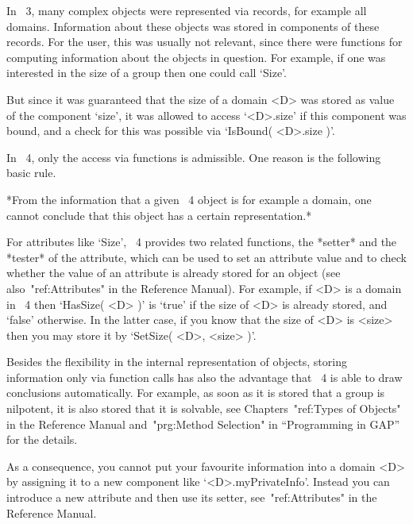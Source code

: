 
In {\GAP}~3, many complex objects were represented via records, for
example all domains.  Information about these objects was stored in
components of these records.  For the user, this was usually not
relevant, since there were functions for computing information about
the objects in question.  For example, if one was interested in the
size of a group then one could call `Size'.

But since it was guaranteed that the size of a domain <D> was stored
as value of the component `size', it was allowed to access `<D>.size'
if this component was bound, and a check for this was possible via
`IsBound( <D>.size )'.

In {\GAP}~4, only the access via functions is admissible.  One reason
is the following basic rule.

*From the information that a given {\GAP}~4 object is for example a
domain, one cannot conclude that this object has a certain
representation.*

For attributes like `Size', {\GAP}~4 provides two related functions,
the *setter* and the *tester* of the attribute, which can be used to
set an attribute value and to check whether the value of an attribute
is already stored for an object (see also~"ref:Attributes" in the
Reference Manual).  For example, if <D> is a domain in {\GAP}~4 then
`HasSize( <D> )' is `true' if the size of <D> is already stored, and
`false' otherwise.  In the latter case, if you know that the size of
<D> is <size> then you may store it by `SetSize( <D>, <size> )'.

Besides the flexibility in the internal representation of objects,
storing information only via function calls has also the advantage
that {\GAP}~4 is able to draw conclusions automatically.  For example,
as soon as it is stored that a group is nilpotent, it is also stored
that it is solvable, see Chapters~"ref:Types of Objects" in the
Reference Manual and~"prg:Method Selection" in ``Programming in GAP''
for the details.

As a consequence, you cannot put your favourite information into a
domain <D> by assigning it to a new component like
`<D>.myPrivateInfo'.  Instead you can introduce a new attribute and
then use its setter, see~"ref:Attributes" in the Reference Manual.



